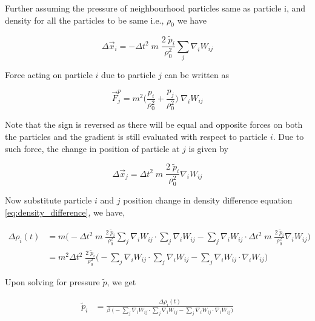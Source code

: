 Further assuming the pressure of neighbourhood particles same as particle i,
and density for all the particles to be same i.e., $\rho_0$ we have

\begin{equation*}
  \Delta \vec{x}_i = - \Delta t^2 \; m \; \frac{2 \;
    \widetilde{p}_i}{\rho_0^2} \sum_j \nabla_i W_{ij}
\end{equation*}

Force acting on particle $i$ due to particle $j$ can be written as

\begin{equation*}
  \vec{F}_j^p = m^2 \bigg( \frac{p_i}{\rho_0^2} +
  \frac{p_j}{\rho_0^2} \bigg)\;\nabla_i W_{ij}
\end{equation*}

Note that the sign is reversed as there will be equal and opposite forces on
both the particles and the gradient is still evaluated with respect to particle
$i$. Due to such force, the change in position of particle at $j$ is given by

\begin{equation*}
  \Delta \vec{x}_j = \Delta t^2 \; m \; \frac{2 \;
    \widetilde{p}_i}{\rho_0^2} \nabla_i W_{ij}
\end{equation*}

Now substitute particle $i$ and $j$ position change in density difference
equation \ref{eq:density_difference}, we have,

\begin{align*}
  \Delta \rho_i(t) &= m \bigg( - \Delta t^2 \; m \; \frac{2 \;
                                  \widetilde{p}_i}{\rho_0^2} \sum_j \nabla_i W_{ij} \cdot \sum_j \nabla_i W_{ij} -
                                  \sum_j \nabla_i W_{ij} \cdot \Delta t^2 \; m \; \frac{2 \;
                     \widetilde{p}_i}{\rho_0^2} \nabla_i W_{ij}\bigg)\\
                   &= m^2 \Delta t^2 \; \frac{2 \; \widetilde{p}_i}{\rho_0^2} \bigg(-
                     \sum_j \nabla_i W_{ij} \cdot \sum_j \nabla_i W_{ij} - \sum_j \nabla_i W_{ij} \cdot \nabla_i W_{ij} \bigg)
\end{align*}

Upon solving for pressure $\widetilde{p}$, we get

\begin{align*}
  \widetilde{p}_i &= \frac{\Delta \rho_i(t)}{\beta \; \bigg(-
                                 \sum_j \nabla_i W_{ij} \cdot \sum_j \nabla_i W_{ij} - \sum_j \nabla_i W_{ij}
                                 \cdot \nabla_i W_{ij} \bigg)}
\end{align*}

